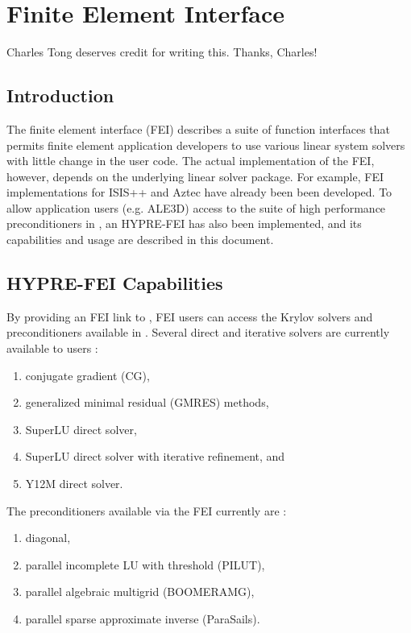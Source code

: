 \chapter{Finite Element Interface}
\label{chapter-FEI}

Charles Tong deserves credit for writing this.  Thanks, Charles!

\section{Introduction}

The finite element interface (FEI) describes a suite of function interfaces 
that permits finite element application developers to use various linear system
solvers with little change in the user code.  The actual implementation of
the FEI, however, depends on the underlying linear solver package.  For example,
FEI implementations for ISIS++ and Aztec have already been been developed.
To allow application users (e.g. ALE3D) access to the suite of high performance
preconditioners in \hypre{}, an HYPRE-FEI has also been implemented, and its
capabilities and usage are described in this document.

\section{HYPRE-FEI Capabilities}

By providing an FEI link to \hypre{}, FEI users can access the Krylov solvers and
preconditioners available in \hypre{}.  Several direct and iterative solvers are
currently available to users :

\begin{enumerate}
\item conjugate gradient (CG), 
\item generalized minimal residual (GMRES) methods,
\item SuperLU direct solver,
\item SuperLU direct solver with iterative refinement, and
\item Y12M direct solver.
\end{enumerate}

The \hypre{} preconditioners available via the FEI currently are :

\begin{enumerate}
\item diagonal, 
\item parallel incomplete LU with threshold (PILUT),
\item parallel algebraic multigrid (BOOMERAMG),
\item parallel sparse approximate inverse (ParaSails).
\end{enumerate}

